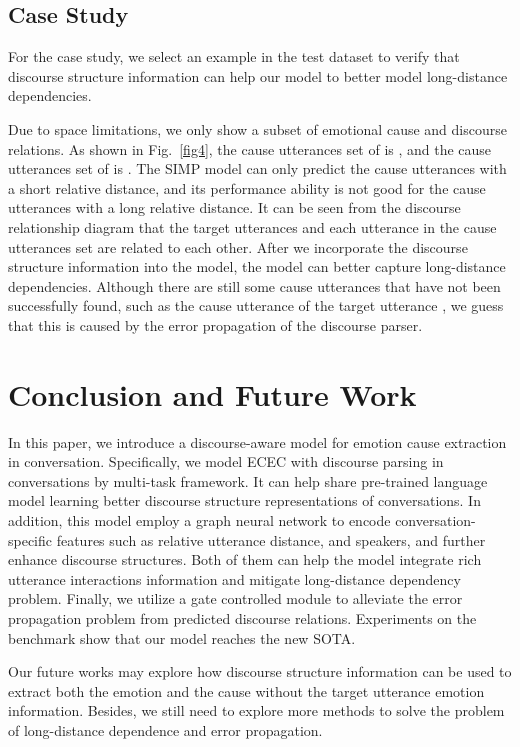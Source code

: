 \documentclass[11pt]{article}
\begin{document}
\subsection{Case Study}

For the case study, we select an example in the test dataset to verify that discourse structure information can help our model to better model long-distance dependencies.

Due to space limitations, we only show a subset of emotional cause and discourse relations.
As shown in Fig.~\ref{fig4}, the cause utterances set of  is , and the cause utterances set of  is .
The SIMP model can only predict the cause utterances with a short relative distance, and its performance ability is not good for the cause utterances with a long relative distance.
It can be seen from the discourse relationship diagram that the target utterances and each utterance in the cause utterances set are related to each other.
After we incorporate the discourse structure information into the model, the model can better capture long-distance dependencies.
Although there are still some cause utterances that have not been successfully found, such as the cause utterance  of the target utterance , we guess that this is caused by the error propagation of the discourse parser.

\section{Conclusion and Future Work}\label{sec:conclusion}
In this paper, we introduce a discourse-aware model for emotion cause extraction in conversation.
Specifically, we model ECEC with discourse parsing in conversations by multi-task framework.
It can help share pre-trained language model learning better discourse structure representations of conversations. 
In addition, this model employ a graph neural network to encode conversation-specific features such as relative utterance distance, and speakers, and further enhance discourse structures.
Both of them can help the model integrate rich utterance interactions information and mitigate long-distance dependency problem.
Finally, we utilize a gate controlled module to alleviate the error propagation problem from predicted discourse relations.
Experiments on the benchmark show that our model reaches the new SOTA.

Our future works may explore how discourse structure information can be used to extract both the emotion and the cause without the target utterance emotion information.
Besides, we still need to explore more methods to solve the problem of long-distance dependence and error propagation.




\end{document}
